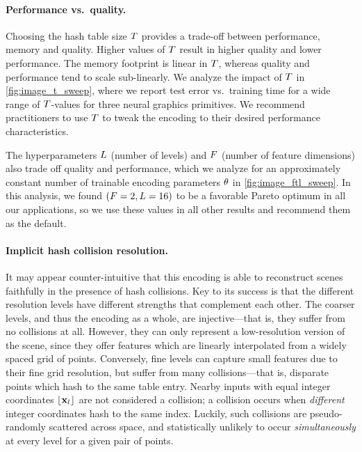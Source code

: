\documentclass[acmtog,authorversion]{acmart}
\begin{document}
\paragraph{Performance vs.\ quality.}
Choosing the hash table size $T$ provides a trade-off between performance, memory and quality.
Higher values of $T$ result in higher quality and lower performance.
The memory footprint is linear in $T$, whereas quality and performance tend to scale sub-linearly.
We analyze the impact of $T$ in \autoref{fig:image_t_sweep}, where we report test error vs.\ training time for a wide range of $T$-values for three neural graphics primitives.
We recommend practitioners to use $T$ to tweak the encoding to their desired performance characteristics.

The hyperparameters $L$ (number of levels) and $F$ (number of feature dimensions) also trade off quality and performance, which we analyze for an approximately constant number of trainable encoding parameters $\theta$ in \autoref{fig:image_ftl_sweep}.
In this analysis, we found ${(F=2,L=16)}$ to be a favorable Pareto optimum in all our applications, so we use these values in all other results and recommend them as the default.

\paragraph{Implicit hash collision resolution.}
It may appear counter-intuitive that this encoding is able to reconstruct scenes faithfully in the presence of hash collisions. 
Key to its success is that the different resolution levels have different strengths that complement each other.
The coarser levels, and thus the encoding as a whole, are injective---that is, they suffer from no collisions at all.
However, they can only represent a low-resolution version of the scene, since they offer features which are linearly interpolated from a widely spaced grid of points.
Conversely, fine levels can capture small features due to their fine grid resolution, but suffer from many collisions---that is, disparate points which hash to the same table entry.
Nearby inputs with equal integer coordinates ${\lfloor \mathbf{x}_l\rfloor}$ are not considered a collision; a collision occurs when \emph{different} integer coordinates hash to the same index.
Luckily, such collisions are pseudo-randomly scattered across space, and statistically unlikely to occur \emph{simultaneously} at every level for a given pair of points.
\end{document}
